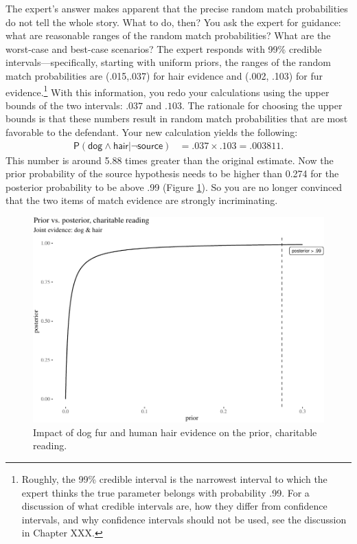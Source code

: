 \documentclass[
  10pt,
  dvipsnames,enabledeprecatedfontcommands]{scrartcl}
\newcommand{\s}[1]{\mbox{$\mathsf{#1}$}}
\begin{document}
The expert's answer makes apparent that the precise random match
probabilities do not tell the whole story. What to do, then? You ask the
expert for guidance: what are reasonable ranges of the random match
probabilities? What are the worst-case and best-case scenarios? The
expert responds with 99\% credible intervals---specifically, starting
with uniform priors, the ranges of the random match probabilities are
(.015,.037) for hair evidence and (.002, .103) for fur
evidence.\footnote{Roughly, the 99\% credible interval is the narrowest
  interval to which the expert thinks the true parameter belongs with
  probability .99. For a discussion of what credible intervals are, how
  they differ from confidence intervals, and why confidence intervals
  should not be used, see the discussion in Chapter XXX.} With this
information, you redo your calculations using the upper bounds of the
two intervals: \(.037\) and \(.103\). The rationale for choosing the
upper bounds is that these numbers result in random match probabilities
that are most favorable to the defendant. Your new calculation yields
the following: \begin{align*}
\mathsf{P}(\s{dog}\wedge \s{hair} \vert \neg \s{source})   & =  .037 \times .103 =.003811.
\end{align*} This number is around 5.88 times greater than the original
estimate. Now the prior probability of the source hypothesis needs to be
higher than 0.274 for the posterior probability to be above .99 (Figure
\ref{fig:impactOfCharitable}). So you are no longer convinced that the
two items of match evidence are strongly incriminating.

\begin{figure}[H]

\begin{center}\includegraphics[width=0.8\linewidth]{chapter-outline_files/figure-latex/fig:charitableImpact7-1} \end{center}
\caption{Impact of dog fur and human hair evidence on the prior, charitable reading.}
\label{fig:impactOfCharitable}
\end{figure}
\end{document}

